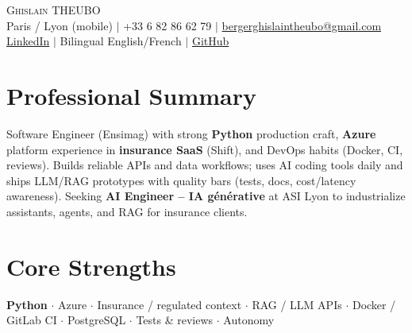 \documentclass[letterpaper,10.5pt]{article}
\begin{document}
\begin{center}
{\Huge \scshape Ghislain THEUBO} \\ \vspace{2pt}
\small Paris / Lyon (mobile) $|$ +33 6 82 86 62 79 $|$ \href{mailto:bergerghislaintheubo@gmail.com}{bergerghislaintheubo@gmail.com} \\
\href{https://www.linkedin.com/in/berger-ghislain}{LinkedIn} $|$ Bilingual English/French $|$ \href{https://github.com/Bergerghislain}{GitHub}
\end{center}
\vspace{-6pt}
\section{Professional Summary}
\small{Software Engineer (Ensimag) with strong \textbf{Python} production craft, \textbf{Azure} platform experience in \textbf{insurance SaaS} (Shift), and DevOps habits (Docker, CI, reviews). Builds reliable APIs and data workflows; uses AI coding tools daily and ships LLM/RAG prototypes with quality bars (tests, docs, cost/latency awareness). Seeking \textbf{AI Engineer -- IA g\'en\'erative} at ASI Lyon to industrialize assistants, agents, and RAG for insurance clients.}
\section{Core Strengths}
\small{\textbf{Python} $\cdot$ Azure $\cdot$ Insurance / regulated context $\cdot$ RAG / LLM APIs $\cdot$ Docker / GitLab CI $\cdot$ PostgreSQL $\cdot$ Tests \& reviews $\cdot$ Autonomy}
\end{document}

